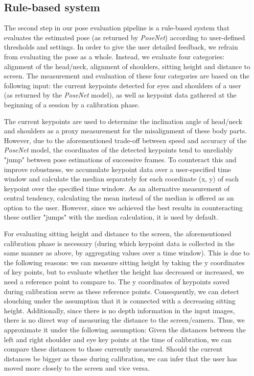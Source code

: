\subsection*{Rule-based system}
\label{rulebased}
The second step in our pose evaluation pipeline is a rule-based system that evaluates the estimated pose (as returned by \textit{PoseNet}) according to user-defined thresholds and settings. In order to give the user detailed feedback, we refrain from evaluating the pose as a whole. Instead, we evaluate four categories: alignment of the head/neck, alignment of shoulders, sitting height and distance to screen. The measurement and evaluation of these four categories are based on the following input: the current keypoints detected for eyes and shoulders of a user (as returned by the \textit{PoseNet} model), as well as keypoint data gathered at the beginning of a session by a calibration phase. 

The current keypoints are used to determine the inclination angle of head/neck and shoulders as a proxy measurement for the misalignment of these body parts. However, due to the aforementioned trade-off between speed and accuracy of the \textit{PoseNet} model, the coordinates of the detected keypoints tend to unreliably "jump" between pose estimations of successive frames. To counteract this and improve robustness, we accumulate keypoint data over a user-specified time window and calculate the median separately for each coordinate (x, y) of each keypoint over the specified time window. As an alternative measurement of central tendency, calculating the mean instead of the median is offered as an option to the user. However, since we achieved the best results in counteracting these outlier "jumps" with the median calculation, it is used by default.

For evaluating sitting height and distance to the screen, the aforementioned calibration phase is necessary (during which keypoint data is collected in the same manner as above, by aggregating values over a time window). This is due to the following reasons: we can measure sitting height by taking the y coordinates of key points, but to evaluate whether the height has decreased or increased, we need a reference point to compare to. The y coordinates of keypoints saved during calibration serve as these reference points. Consequently, we can detect slouching under the assumption that it is connected with a decreasing sitting height. Additionally, since there is no depth information in the input images, there is no direct way of measuring the distance to the screen/camera. Thus, we approximate it under the following assumption: Given the distances between the left and right shoulder and eye key points at the time of calibration, we can compare these distances to those currently measured. Should the current distances be bigger as those during calibration, we can infer that the user has moved more closely to the screen and vice versa.

